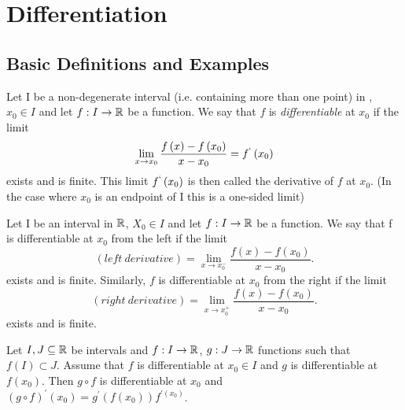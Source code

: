 
\setcounter{chapter}{4}
\chapter{Differentiation}


	\section{Basic Definitions and Examples}

	\begin{definition}
		Let I be a non-degenerate interval (i.e. containing more than one point) in \R, $x_0 \in I$ and let  $f:I\to \mathbb{R}$ be a function. We say that $f$ is \emph{differentiable} at $x_0$ if the limit
		\[
		\lim_{x \to x_0} \frac{f\left( x \right) - f\left( x_0 \right) }{x-x_0} = f^{`}\left( x_0 \right)		
	\] 
	exists and is finite. This limit $f^{`}\left( x_0 \right) $ is then called the derivative of $f$ at $x_0$. (In the case where $x_0$ is an endpoint of I this is a one-sided limit)
	\end{definition}

	\begin{definition}
		Let I be an interval in $\mathbb{R}$, $X_0 \in I$ and let $f:I \to  \mathbb{R}$ be a function. We say that f is differentiable at $x_0$ from the left if the limit
		\[
			\left( left \: derivative \right) = \lim_{x \to x_0^{-}}  \frac{f\left( x \right) - f\left( x_0 \right) }{x - x_0}
		.\] 
		exists and is finite. Similarly, $f$ is differentiable at $x_0$ from the right if the limit
		\[
			\left( right \: derivative \right) = \lim_{x \to x_0^{+}} \frac{f\left( x \right) - f\left( x_0 \right) }{x-x_0}
		.\] 
		exists and is finite.
	\end{definition}

	\begin{theorem}
		Let $I, J \subseteq \mathbb{R}$ be intervals and $f:I \to \mathbb{R}$, $g:J \to \mathbb{R}$ functions such that $f\left( I \right) \subset J$. Assume that $f$ is differentiable at $x_0 \in I$ and $g$ is differentiable at $f\left( x_0 \right) $. Then $g \circ f$ is differentiable at $x_0$ and $\left( g \circ f \right)^{'}\left( x_0 \right) = g^{'}\left( f\left( x_0 \right)  \right) f^{'\left( x_0 \right) } $.
	\end{theorem}

